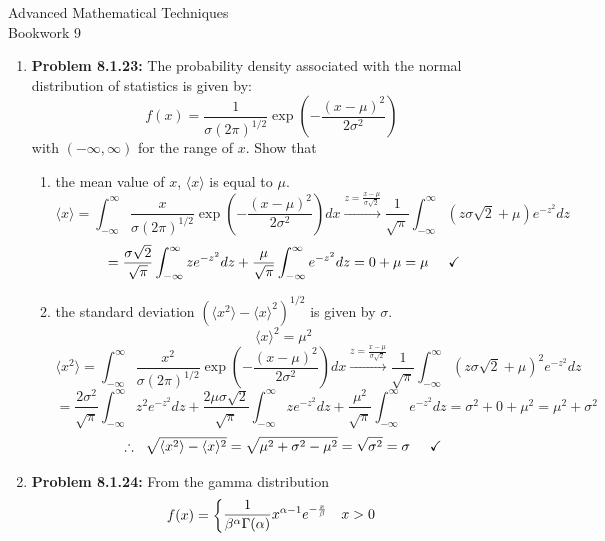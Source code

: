 \documentclass{article}
\begin{document}
\thispagestyle{fancy}
\begin{center}\LARGE{Advanced Mathematical Techniques \\ Bookwork 9}\end{center}
\vspace{10mm}
\begin{enumerate}
    \item \textbf{Problem 8.1.23:} The probability density associated with the normal distribution of statistics is given by:
    \[f(x) = \frac 1 {\sigma (2\pi)^{1/2}}\exp(-\frac{(x-\mu)^2}{2\sigma^2})\]
    with $(-\infty, \infty)$ for the range of $x$. Show that
    \begin{enumerate}
        \item the mean value of $x$, $\langle x \rangle$ is equal to $\mu$.
        \\
        \[\langle x \rangle = \int_{-\infty}^{\infty} \frac x {\sigma (2\pi)^{1/2}}\exp(-\frac{(x-\mu)^2}{2\sigma^2})dx \xrightarrow{z = \frac{x-\mu}{\sigma \sqrt{2}}} \frac{1}{\sqrt{\pi}} \int_{-\infty}^{\infty} (z\sigma \sqrt 2 + \mu)e^{-z^2}dz\]
        \[ = \frac{\sigma \sqrt 2}{\sqrt \pi} \int_{-\infty}^{\infty} z e^{-z^2}dz + \frac{\mu}{\sqrt \pi} \int_{-\infty}^{\infty} e^{-z^2}dz = 0 + \mu = \mu \hspace{5mm} \checkmark\]
        \item the standard deviation $(\langle x^2 \rangle - \langle x \rangle ^2)^{1/2}$ is given by $\sigma$.
       \\ \[\langle x \rangle ^2 = \mu^2\]
        \[\langle x^2 \rangle = \int_{-\infty}^{\infty} \frac {x^2} {\sigma (2\pi)^{1/2}}\exp(-\frac{(x-\mu)^2}{2\sigma^2})dx \xrightarrow{z = \frac{x-\mu}{\sigma \sqrt{2}}} \frac{1}{\sqrt{\pi}} \int_{-\infty}^{\infty} (z\sigma \sqrt 2 + \mu)^2e^{-z^2}dz\]
        \[ = \frac{2\sigma^2}{\sqrt \pi} \int_{-\infty}^{\infty} z^2e^{-z^2}dz + \frac{2\mu\sigma \sqrt 2}{\sqrt \pi} \int_{-\infty}^{\infty} z e^{-z^2}dz + \frac{\mu^2}{\sqrt \pi} \int_{-\infty}^{\infty} e^{-z^2}dz = \sigma^2 + 0 + \mu^2 = \mu^2 + \sigma^2\]
        \[\therefore \hspace{2mm} \sqrt{\langle x ^2 \rangle - \langle x \rangle ^2} = \sqrt{\mu^2 + \sigma^2 - \mu^2} = \sqrt{\sigma^2} = \sigma \hspace{5mm} \checkmark\]
    \end{enumerate}
    \item \textbf{Problem 8.1.24:} From the gamma distribution
    \[f(x) = \begin{dcases}
    \frac{1}{\beta^\alpha\Gamma(\alpha)}x^{\alpha - 1}e^{-\frac x \beta} & x > 0 \\

\end{dcases}\]
\end{enumerate}
\end{document}
